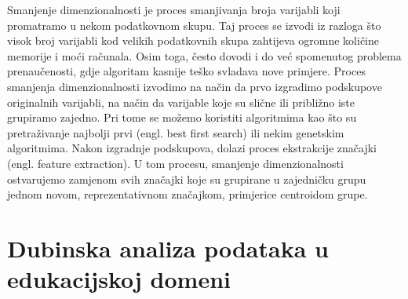 \documentclass[times, utf8, zavrsni, numeric]{fer}
\begin{document}
Smanjenje dimenzionalnosti je proces smanjivanja broja varijabli koji promatramo u nekom podatkovnom skupu. Taj proces se izvodi iz razloga što visok broj varijabli kod velikih podatkovnih skupa zahtijeva ogromne količine memorije i moći računala. Osim toga, često dovodi i do već spomenutog problema prenaučenosti, gdje algoritam kasnije teško svladava nove primjere. Proces smanjenja dimenzionalnosti izvodimo na način da prvo izgradimo podskupove originalnih varijabli, na način da varijable koje su slične ili približno iste grupiramo zajedno. Pri tome se možemo koristiti algoritmima kao što su pretraživanje najbolji prvi (engl. best first search) ili nekim genetskim algoritmima. Nakon izgradnje podskupova, dolazi proces ekstrakcije značajki (engl. feature extraction). U tom procesu, smanjenje dimenzionalnosti ostvarujemo zamjenom svih značajki koje su grupirane u zajedničku grupu jednom novom, reprezentativnom značajkom, primjerice centroidom grupe.

\chapter{Dubinska analiza podataka u edukacijskoj domeni}
\end{document}
